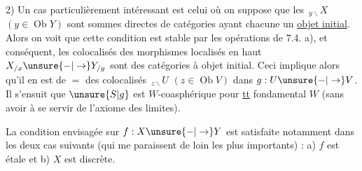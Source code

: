 2) Un cas particulièrement intéressant 
est celui où on suppose que les $\,{}_{y\backslash}X$ $(y\in\operatorname{Ob}Y)$
sont  sommes directes de catégories
ayant chacune un \uline{objet initial}. Alors
on voit que cette condition est stable par
les opérations de 7.4. a), et 
conséquent, les colocalisés  des morphismes
localisés en haut $X_{/x}\unsure{-|\to}Y_{/y}$ sont des
catégories à objet initial. Ceci  implique alors qu'il en est de
$=$ des colocalisés $\,{}_{z\backslash}U$ $(z\in\operatorname{Ob}V)$ dans
$g:U\unsure{-|\to}V$. Il s'ensuit que $\unsure{S|g}$ est
$W$-coasphérique pour \uline{tt}  
fondamental $W$ (sans avoir à se servir
de l'axiome des limites).

La condition envisagée sur $f:X\unsure{-|\to}Y$
est satisfaite notamment dans les
deux cas suivants (qui me paraissent
de loin les plus importants) : a) $f$ est
étale et b) $X$ est discrète.
